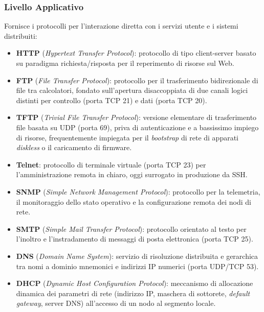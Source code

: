 \documentclass[11pt, a4paper]{article}
\begin{document}
\subsubsection{Livello Applicativo}
Fornisce i protocolli per l'interazione diretta con i servizi utente e i sistemi distribuiti:
\begin{itemize}
    \item \textbf{HTTP} (\emph{Hypertext Transfer Protocol}): protocollo di tipo client-server basato su paradigma richiesta/risposta per il reperimento di risorse sul Web.
    \item \textbf{FTP} (\emph{File Transfer Protocol}): protocollo per il trasferimento bidirezionale di file tra calcolatori, fondato sull'apertura disaccoppiata di due canali logici distinti per controllo (porta TCP 21) e dati (porta TCP 20).
    \item \textbf{TFTP} (\emph{Trivial File Transfer Protocol}): versione elementare di trasferimento file basata su UDP (porta 69), priva di autenticazione e a bassissimo impiego di risorse, frequentemente impiegata per il \emph{bootstrap} di rete di apparati \emph{diskless} o il caricamento di firmware.
    \item \textbf{Telnet}: protocollo di terminale virtuale (porta TCP 23) per l'amministrazione remota in chiaro, oggi surrogato in produzione da SSH.
    \item \textbf{SNMP} (\emph{Simple Network Management Protocol}): protocollo per la telemetria, il monitoraggio dello stato operativo e la configurazione remota dei nodi di rete.
    \item \textbf{SMTP} (\emph{Simple Mail Transfer Protocol}): protocollo orientato al testo per l'inoltro e l'instradamento di messaggi di posta elettronica (porta TCP 25).
    \item \textbf{DNS} (\emph{Domain Name System}): servizio di risoluzione distribuita e gerarchica tra nomi a dominio mnemonici e indirizzi IP numerici (porta UDP/TCP 53).
    \item \textbf{DHCP} (\emph{Dynamic Host Configuration Protocol}): meccanismo di allocazione dinamica dei parametri di rete (indirizzo IP, maschera di sottorete, \emph{default gateway}, server DNS) all'accesso di un nodo al segmento locale.
\end{itemize}
\end{document}
